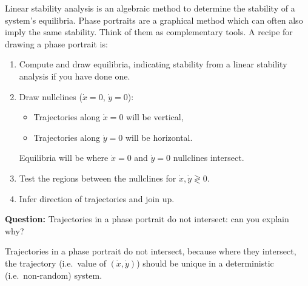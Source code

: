 \documentclass[a4paper,12pt]{article}
\begin{document}
%


\begin{enumerate}[label={\bf \arabic{*}.\;}, ref={\arabic{*}},itemsep=3ex, left=0ex]

    { %
      Linear stability analysis is an algebraic method to determine the stability of a system's equilibria. Phase portraits are a graphical method which can often also imply the same stability. Think of them as complementary tools. A recipe for drawing a phase portrait is:
      \begin{enumerate}[label=(\roman*)]
        \item Compute and draw equilibria, indicating stability from a linear stability analysis if you have done one.
        \item Draw nullclines ($\dot{x} = 0$, $\dot{y} = 0$):
          \begin{itemize}
            \item Trajectories along $\dot{x}=0$ will be vertical,
            \item Trajectories along $\dot{y}=0$ will be horizontal.
          \end{itemize}
          Equilibria will be where $\dot{x}=0$ and $\dot{y}=0$ nullclines intersect.
        \item Test the regions between the nullclines for $\dot{x}, \dot{y} \gtrless 0$.
        \item Infer direction of trajectories and join up.
      \end{enumerate}

      \textbf{Question:} Trajectories in a phase portrait do not intersect: can you explain why?
    }
    { %
      Trajectories in a phase portrait do not intersect, because where they intersect, the trajectory (i.e.\ value of $(\dot{x},\dot{y})$) should be unique in a deterministic (i.e.\ non-random) system.
    }


\end{enumerate}
\end{document}
